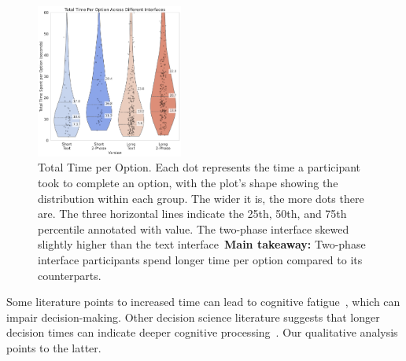 \begin{figure}[H]
    \centering
    \includegraphics[width=0.43\textwidth, trim=0 0 0 0, clip]{content/image/time/Total Time Per Option Across Different Interfaces.pdf}
    \caption{Total Time per Option. Each dot represents the time a participant took to complete an option, with the plot's shape showing the distribution within each group. The wider it is, the more dots there are. The three horizontal lines indicate the 25th, 50th, and 75th percentile annotated with value. The two-phase interface skewed slightly higher than the text interface~\textbf{Main takeaway: } Two-phase interface participants spend longer time per option compared to its counterparts.}
    \vspace{-8pt}
    \label{fig:total_time}
\end{figure}

Some literature points to increased time can lead to cognitive fatigue~\cite{kundingerReliableGroundTruth2020, karim2024examining}, which can impair decision-making. Other decision science literature suggests that longer decision times can indicate deeper cognitive processing~\cite{payneAdaptiveDecisionMaker1993, daniel2017thinking}. Our qualitative analysis points to the latter.

